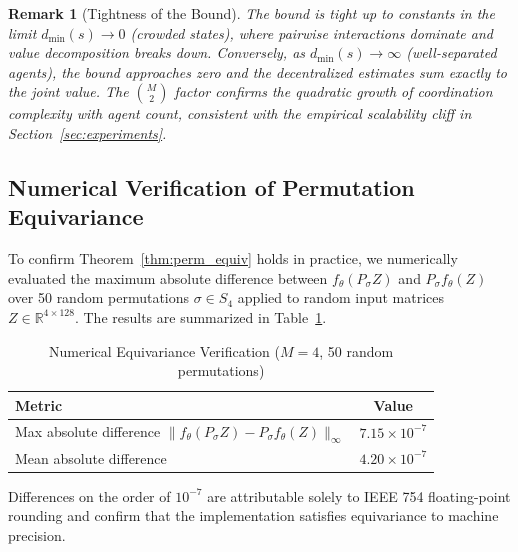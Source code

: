 \documentclass[11pt,a4paper]{article}
\newtheorem{remark}{Remark}
\begin{document}
\begin{remark}[Tightness of the Bound]
The bound is tight up to constants in the limit $d_{\min}(s) \to 0$ (crowded states), where pairwise interactions dominate and value decomposition breaks down. Conversely, as $d_{\min}(s) \to \infty$ (well-separated agents), the bound approaches zero and the decentralized estimates sum exactly to the joint value. The $\binom{M}{2}$ factor confirms the quadratic growth of coordination complexity with agent count, consistent with the empirical scalability cliff in Section~\ref{sec:experiments}.
\end{remark}

\subsection{Numerical Verification of Permutation Equivariance}\label{app:numerical_equiv}
To confirm Theorem~\ref{thm:perm_equiv} holds in practice, we numerically evaluated the maximum absolute difference between $f_\theta(P_\sigma Z)$ and $P_\sigma f_\theta(Z)$ over 50 random permutations $\sigma \in S_4$ applied to random input matrices $Z \in \mathbb{R}^{4 \times 128}$. The results are summarized in Table~\ref{tab:equiv_check}.

\begin{table}[H]
\centering
\small
\begin{tabular}{|l|c|}
\hline
\textbf{Metric} & \textbf{Value} \\
\hline
Max absolute difference $\|f_\theta(P_\sigma Z) - P_\sigma f_\theta(Z)\|_\infty$ & $7.15 \times 10^{-7}$ \\
Mean absolute difference & $4.20 \times 10^{-7}$ \\
\hline
\end{tabular}
\caption{Numerical Equivariance Verification ($M=4$, 50 random permutations)}
\label{tab:equiv_check}
\end{table}
Differences on the order of $10^{-7}$ are attributable solely to IEEE 754 floating-point rounding and confirm that the implementation satisfies equivariance to machine precision.
\end{document}
